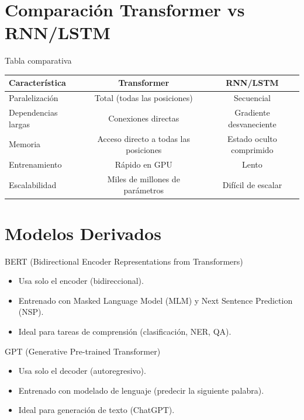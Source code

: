 \documentclass[aspectratio=169, 10pt, xcolor=table]{beamer}
\begin{document}
\section{Comparación Transformer vs RNN/LSTM}

\begin{frame}{Tabla comparativa}
    \begin{table}
        \centering
        \begin{tabular}{l|c|c}
            \toprule
            \textbf{Característica} & \textbf{Transformer} & \textbf{RNN/LSTM} \\
            \midrule
            Paralelización & Total (todas las posiciones) & Secuencial \\
            Dependencias largas & Conexiones directas & Gradiente desvaneciente \\
            Memoria & Acceso directo a todas las posiciones & Estado oculto comprimido \\
            Entrenamiento & Rápido en GPU & Lento \\
            Escalabilidad & Miles de millones de parámetros & Difícil de escalar \\
            \bottomrule
        \end{tabular}
    \end{table}
\end{frame}

\section{Modelos Derivados}

\begin{frame}{BERT (Bidirectional Encoder Representations from Transformers)}
    \begin{itemize}
        \item Usa solo el encoder (bidireccional).
        \item Entrenado con Masked Language Model (MLM) y Next Sentence Prediction (NSP).
        \item Ideal para tareas de comprensión (clasificación, NER, QA).
    \end{itemize}
\end{frame}

\begin{frame}{GPT (Generative Pre-trained Transformer)}
    \begin{itemize}
        \item Usa solo el decoder (autoregresivo).
        \item Entrenado con modelado de lenguaje (predecir la siguiente palabra).
        \item Ideal para generación de texto (ChatGPT).
    \end{itemize}
\end{frame}
\end{document}
